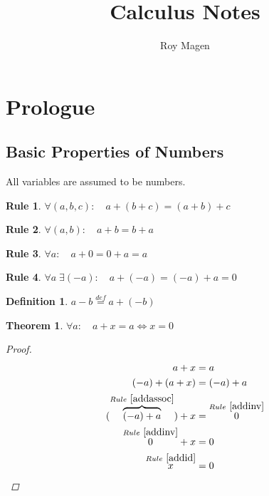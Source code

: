 \documentclass{article}
\title{Calculus Notes}
\author{Roy Magen}
\date{ }
\numberwithin{equation}{subsubsection}
\newtheorem{lrule}{Rule}
\newtheorem{defn}{Definition}
\newtheorem{thm}{Theorem}
\newcommand{\fromb}[3]{\overbrace{#3}^{#1~\ref{#2}}}
\newcommand{\from}[3]{\overset{#1~\ref{#2}}{#3}}
\begin{document}
\begin{titlepage}
    \maketitle
\end{titlepage}
\tableofcontents
\pagebreak

\section{Prologue}
    \subsection{Basic Properties of Numbers}
    \newcommand{\nums}{\{\text{ numbers }\}}
    All variables are assumed to be numbers.
	    \begin{lrule}\label{addassoc} $ \forall (a,b,c) : \quad a + (b + c) = (a + b) + c $ \end{lrule}
	    \begin{lrule}\label{addcomm} $ \forall (a,b) : \quad a + b = b + a $ \end{lrule}
	    \begin{lrule}\label{addid} $ \forall a : \quad a + 0 = 0 + a = a $ \end{lrule}
	    \begin{lrule}\label{addinv} $ \forall a \;\exists (-a) : \quad a + (-a) = (-a) + a = 0 $ \end{lrule}
	    \begin{defn} $ a - b \overset{def}{=} a + (-b) $ \end{defn}

	    \begin{thm}
		$ \forall a : \quad a + x = a \iff x = 0 $
		\begin{proof}
		    \begin{align}
			a + x &= a \\
			(-a) + (a + x) &= (-a) + a \\
			(\fromb{Rule}{addassoc}{(-a) + a}) + x &= \from{Rule}{addinv}{0} \\
			\from{Rule}{addinv}{0} + x &= 0 \\
			\from{Rule}{addid}{x} &= 0
		    \end{align}
		\end{proof}
	    \end{thm}
\end{document}
